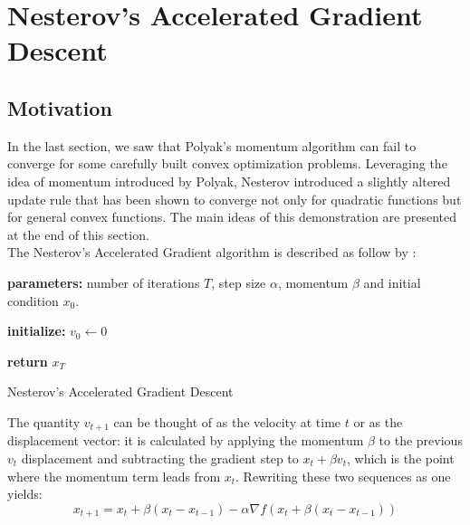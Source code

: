 \documentclass{article}
\begin{document}
%
%


\section{Nesterov's Accelerated Gradient Descent}

\subsection{Motivation}

In the last section, we saw that Polyak's momentum algorithm can fail to converge for some carefully built convex optimization problems. Leveraging the idea of momentum introduced by Polyak, Nesterov introduced a slightly altered update rule that has been shown to converge not only for quadratic functions but for general convex functions. 
The main ideas of this demonstration are presented at the end of this section.\\

The Nesterov's Accelerated Gradient algorithm is described as follow by \citet{Sutskever2013}:
\begin{algorithm}[H]
\SetAlgoLined
\textbf{parameters:} number of iterations $T$, step size $\alpha$, momentum $\beta$ and initial condition $x_0$.

\textbf{initialize:} $v_0 \gets 0$

 
 \textbf{return } $x_{T}$
 \caption{Nesterov's Accelerated Gradient Descent \label{NAGD}}
\end{algorithm}


The quantity $v_{t+1}$ can be thought of as the velocity at time $t$ or as the displacement vector: it is calculated by applying the momentum $\beta$ to the previous $v_t$ displacement and subtracting the gradient step to $x_t + \beta v_t$, which is the point where the momentum term leads from $x_t$. 
Rewriting these two sequences as one yields:
\begin{equation} \label{eq:2}
	x_{t+1} = x_t + \beta(x_t - x_{t-1}) - \alpha \nabla f(x_t + \beta (x_t - x_{t-1}))
\end{equation}
\end{document}
